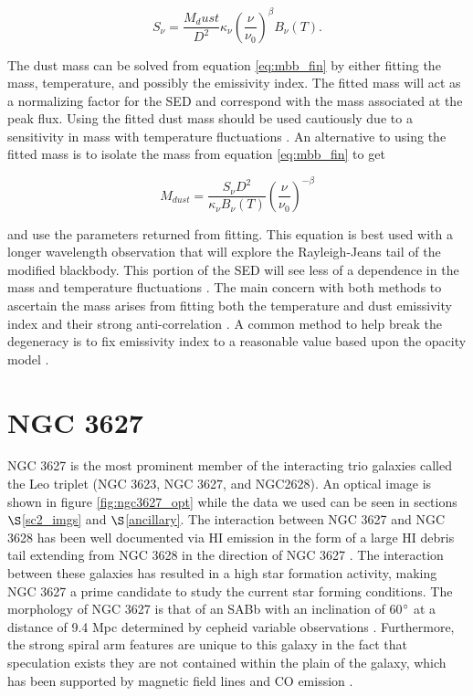 \begin{equation}\label{eq:mbb_fin}
  S_\nu=\frac{M_dust}{D^2}\kappa_\nu\left(\frac{\nu}{\nu_0}\right)^\beta B_\nu\left(T\right).
\end{equation}

The dust mass can be solved from equation \ref{eq:mbb_fin} by either fitting the mass, temperature, and possibly the emissivity index.  The fitted mass will act as a normalizing factor for the SED and correspond with the mass associated at the peak flux.  Using the fitted dust mass should be used cautiously due to a sensitivity in mass with temperature fluctuations \citep{draine2007}. An alternative to using the fitted mass is to isolate the mass from equation \ref{eq:mbb_fin} to get 

\begin{equation}\label{eq:mbb_mass}
  M_{dust} = \frac{S_\nu D^2}{\kappa_\nu B_\nu\left(T\right)}\left(\frac{\nu}{\nu_0}\right)^{-\beta}
\end{equation}

and use the parameters returned from fitting.  This equation is best used with a longer wavelength observation that will explore the Rayleigh-Jeans tail of the modified blackbody.  This portion of the SED will see less of a dependence in the mass and temperature fluctuations \citep{draine2007}.  The main concern with both methods to ascertain the mass arises from fitting both the temperature and dust emissivity index and their strong anti-correlation \citep{galametz2012,tabatabaei2014}.  A common method to help break the degeneracy is to fix emissivity index to a reasonable value based upon the opacity model \citep{tabatabaei2014}.

\section{NGC 3627}

NGC 3627 is the most prominent member of the interacting trio galaxies called the Leo triplet (NGC 3623, NGC 3627,  and NGC2628).  An optical image is shown in figure \ref{fig:ngc3627_opt} while the data we used can be seen in sections $\S$\ref{sc2_imgs} and $\S$\ref{ancillary}.  The interaction between NGC 3627 and NGC 3628 has been well documented via HI emission in the form of a large HI debris tail extending from NGC 3628 in the direction of NGC 3627 \citep{rots1978,haynes1979}.  The interaction between these galaxies has resulted in a high star formation activity, making NGC 3627 a prime candidate to study the current star forming conditions.  The morphology of NGC 3627 is that of an SABb with an inclination of 60$\degree$ \citep{reuter1996} at a distance of 9.4 Mpc determined by cepheid variable observations \citep{kennicutt2011}.  Furthermore, the strong spiral arm features are unique to this galaxy in the fact that speculation exists they are not contained within the plain of the galaxy, which has been supported by magnetic field lines \citep{soida2001} and CO emission \citep{dumke2011}.

